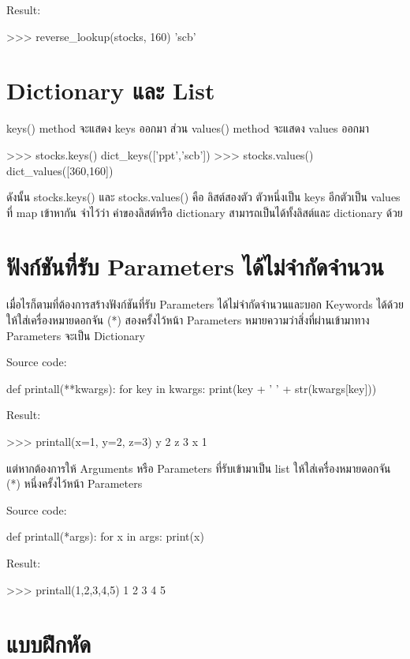 Result:
\begin{pycode}
>>> reverse_lookup(stocks, 160)
'scb'
\end{pycode}


\section{Dictionary และ List}

keys() method จะแสดง keys ออกมา ส่วน values() method จะแสดง values ออกมา 

\begin{pycode}
>>> stocks.keys()
dict_keys(['ppt','scb'])
>>> stocks.values()
dict_values([360,160])
\end{pycode}


ดังนั้น stocks.keys() และ stocks.values() คือ ลิสต์สองตัว ตัวหนึ่งเป็น keys อีกตัวเป็น values ที่ map เข้าหากัน จำไว้ว่า ค่าของลิสต์หรือ dictionary สามารถเป็นได้ทั้งลิสต์และ dictionary ด้วย

\section{ฟังก์ชันที่รับ Parameters ได้ไม่จำกัดจำนวน }

เมื่อไรก็ตามที่ต้องการสร้างฟังก์ชันที่รับ Parameters ได้ไม่จำกัดจำนวนและบอก Keywords ได้ด้วย ให้ใส่เครื่องหมายดอกจัน (*) สองครั้งไว้หน้า Parameters หมายความว่าสิ่งที่ผ่านเข้ามาทาง Parameters จะเป็น Dictionary 

Source code:
\begin{pycode}
def printall(**kwargs):
    for key in kwargs:
        print(key + ' ' + str(kwargs[key]))
\end{pycode}
Result:
\begin{pycode}
>>> printall(x=1, y=2, z=3)
y 2
z 3
x 1
\end{pycode}

แต่หากต้องการให้ Arguments หรือ Parameters ที่รับเข้ามาเป็น list ให้ใส่เครื่องหมายดอกจัน (*) หนึ่งครั้งไว้หน้า Parameters 

Source code:
\begin{pycode}
def printall(*args):
    for x in args:
        print(x)
\end{pycode}
Result:
\begin{pycode}
>>> printall(1,2,3,4,5)
1
2
3
4
5
\end{pycode}

\section{แบบฝึกหัด}


